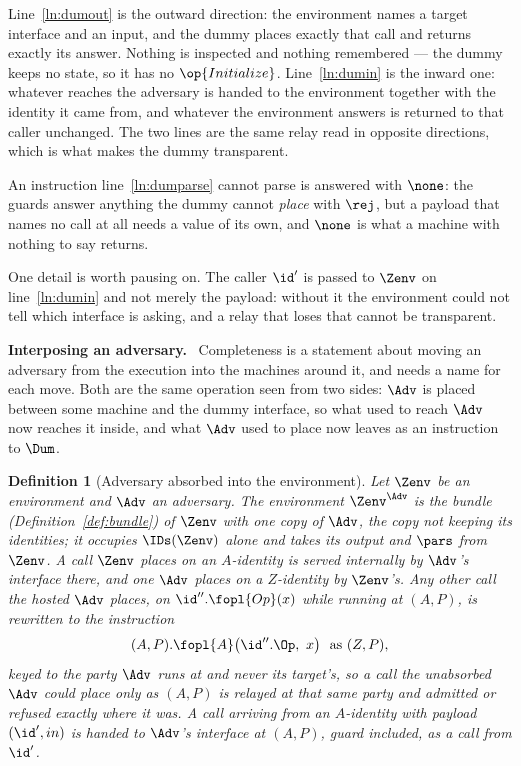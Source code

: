 \documentclass[10pt,oneside,openany]{book}
\newcommand{\heading}[1]{\medskip\par\noindent\textcolor{accent}{\textbf{#1.}}\ }
\theoremstyle{accentdef}
\newtheorem{definition}{Definition}[chapter]
\theoremstyle{accentplain}
\begin{document}
Line~\ref{ln:dumout} is the outward direction: the environment names a target interface and an
input, and the dummy places exactly that call and returns exactly its answer. Nothing is inspected
and nothing remembered --- the dummy keeps no state, so it has no $\op{Initialize}$.
Line~\ref{ln:dumin} is the inward one: whatever reaches the adversary is handed to the environment
together with the identity it came from, and whatever the environment answers is returned to that
caller unchanged. The two lines are the same relay read in opposite directions, which is what
makes the dummy transparent.

An instruction line~\ref{ln:dumparse} cannot parse is answered with $\none$: the guards answer
anything the dummy cannot \emph{place} with $\rej$, but a payload that names no call at all needs
a value of its own, and $\none$ is what a machine with nothing to say returns.

One detail is worth pausing on. The caller $\id'$ is passed to $\Zenv$ on line~\ref{ln:dumin}
and not merely the payload: without it the environment could not tell which interface is asking,
and a relay that loses that cannot be transparent.

\heading{Interposing an adversary} Completeness is a statement about moving an adversary from the
execution into the machines around it, and needs a name for each move. Both are the same operation
seen from two sides: $\Adv$ is placed between some machine and the dummy interface, so what used
to reach $\Adv$ now reaches it inside, and what $\Adv$ used to place now leaves as an instruction
to $\Dum$.

\begin{definition}[Adversary absorbed into the environment]\label{def:zadv}
Let $\Zenv$ be an environment and $\Adv$ an adversary. The environment $\Zenv^{\Adv}$ is the
bundle (Definition~\ref{def:bundle}) of $\Zenv$ with one copy of $\Adv$, the copy \emph{not}
keeping its identities; it occupies $\IDs(\Zenv)$ alone and takes its output and $\pars$ from
$\Zenv$. A call $\Zenv$ places on an $A$-identity is served internally by $\Adv$'s interface
there, and one $\Adv$ places on a $Z$-identity by $\Zenv$'s. Any other call the hosted $\Adv$
places, on $\id''.\fopl{Op}(x)$ while running at $(A,P)$, is rewritten to the instruction
\[
  (A,P).\fopl{A}\bigl(\id''.\Op,\ x\bigr) \ \text{ as } (Z,P) ,
\]
keyed to the party $\Adv$ runs at and never its target's, so a call the unabsorbed $\Adv$ could
place only as $(A,P)$ is relayed at that same party and admitted or refused exactly where it was.
A call arriving from an $A$-identity with payload $(\id',in)$ is handed to $\Adv$'s interface at
$(A,P)$, guard included, as a call from $\id'$.
\end{definition}
\end{document}
